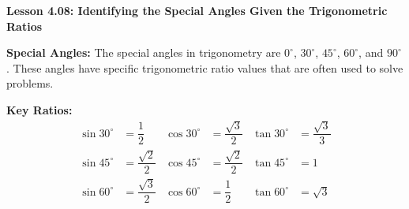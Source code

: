 \begin{center}
\textbf{Lesson 4.08: Identifying the Special Angles Given the Trigonometric Ratios}
\end{center}

\vspace*{-1.5ex}

\noindent \textbf{Special Angles:} The special angles in trigonometry are \(0^\circ\), \(30^\circ\), \(45^\circ\), \(60^\circ\), and \(90^\circ\). These angles have specific trigonometric ratio values that are often used to solve problems.

\noindent  \textbf{Key Ratios:}
    \begin{align*}
        \sin 30^\circ &= \dfrac{1}{2} & \cos 30^\circ &= \dfrac{\sqrt{3}}{2} & \tan 30^\circ &= \dfrac{\sqrt{3}}{3} \\
        \sin 45^\circ &= \dfrac{\sqrt{2}}{2} & \cos 45^\circ &= \dfrac{\sqrt{2}}{2} & \tan 45^\circ &= 1 \\
        \sin 60^\circ &= \dfrac{\sqrt{3}}{2} & \cos 60^\circ &= \dfrac{1}{2} & \tan 60^\circ &= \sqrt{3}
    \end{align*}


